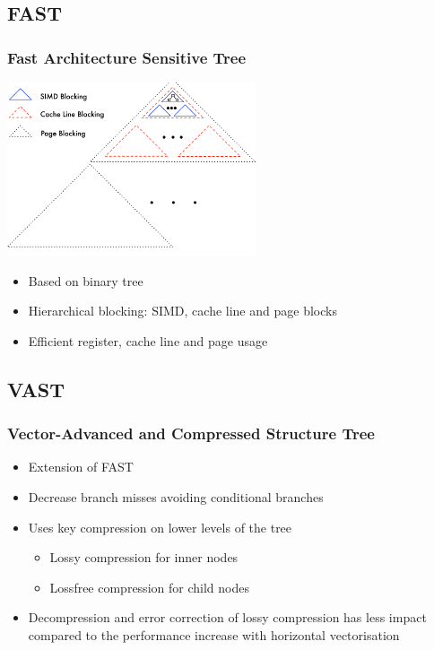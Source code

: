 \documentclass{beamer}
\begin{document}
\subsection{FAST}
\begin{frame}
\frametitle{Fast Architecture Sensitive Tree}
\begin{center}
	\includegraphics[width=0.55\textwidth]{img/fast2.png}
\end{center}
\begin{itemize}
	\item Based on binary tree
	\item Hierarchical blocking: SIMD, cache line and page blocks
	\item Efficient register, cache line and page usage
\end{itemize}
\end{frame}

\subsection{VAST}
\begin{frame}
	\frametitle{Vector-Advanced and Compressed Structure Tree}
	\begin{itemize}
		\item Extension of FAST
		\item Decrease branch misses avoiding conditional branches
		\item Uses key compression on lower levels of the tree
		\begin{itemize}
			\item Lossy compression for inner nodes
			\item Lossfree compression for child nodes
		\end{itemize}
		\item  Decompression and error correction of lossy compression has less impact compared to the performance increase with horizontal vectorisation 
	\end{itemize}
\end{frame}
\end{document}
